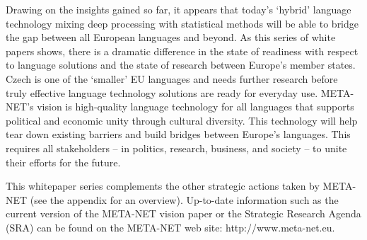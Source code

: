 \documentclass[]{../../metanetpaper}
\begin{document}
\begin{multicols}{2}

Drawing on the insights gained so far, it appears that today’s ‘hybrid’ language technology mixing deep processing with statistical methods will be able to bridge the gap between all European languages and beyond. As this series of white papers shows, there is a dramatic difference in the state of readiness with respect to language solutions and the state of research between Europe’s member states. Czech is one of the ‘smaller’ EU languages and needs further research before truly effective language technology solutions are ready for everyday use.
META-NET’s vision is high-quality language technology for all languages that supports political and economic unity through cultural diversity. This technology will help tear down existing barriers and build bridges between Europe’s languages. This requires all stakeholders -- in politics, research, business, and society -- to unite their efforts for the future.

This whitepaper series complements the other strategic actions taken by META-NET (see the appendix for an overview). Up-to-date information such as the current version of the META-NET vision paper \cite{Meta1} or the Strategic Research Agenda (SRA) can be found on the META-NET web site: http://www.meta-net.eu.
\end{multicols}
\clearpage
\end{document}
